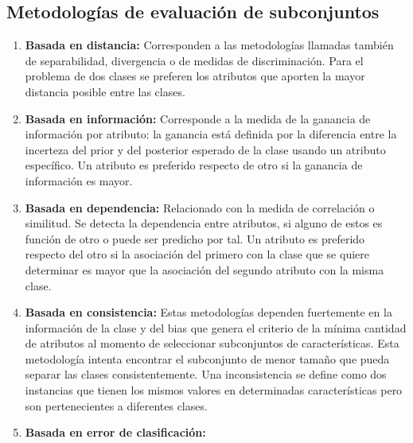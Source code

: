 \subsection{Metodolog\'ias de evaluaci\'on de subconjuntos}
\begin{enumerate}
\item \textbf{Basada en distancia:} Corresponden a las metodolog\'ias llamadas tambi\'en de separabilidad, divergencia o de medidas de discriminaci\'on. Para el problema de dos clases se preferen los atributos que aporten la mayor distancia posible entre las clases. 
\item \textbf{Basada en informaci\'on:} Corresponde a la medida de la ganancia de informaci\'on por atributo: la ganancia est\'a definida por la diferencia entre la incerteza del prior y del posterior esperado de la clase usando un atributo espec\'ifico. Un atributo es preferido respecto de otro si la ganancia de informaci\'on es mayor.
\item \textbf{Basada en dependencia:} Relacionado con la medida de correlaci\'on o similitud. Se detecta la dependencia entre atributos, si alguno de estos es funci\'on de otro o puede ser predicho por tal. Un atributo es preferido respecto del otro si la asociaci\'on del primero con la clase que se quiere determinar es mayor que la asociaci\'on del segundo atributo con la misma clase.
\item \textbf{Basada en consistencia:} Estas metodolog\'ias dependen fuertemente en la informaci\'on de la clase y del bias que genera el criterio de la m\'inima cantidad de atributos al momento de seleccionar subconjuntos de caracter\'isticas. Esta metodolog\'ia intenta encontrar el subconjunto de menor tama\~no que pueda separar las clases consistentemente. Una inconsistencia se define como dos instancias que tienen los mismos valores en determinadas caracter\'isticas pero son pertenecientes a diferentes clases.
\item \textbf{Basada en error de clasificaci\'on:}
\end{enumerate}